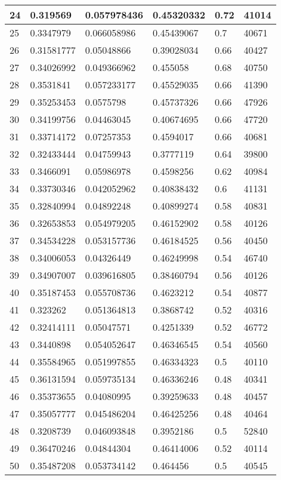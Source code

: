 \begin{longtable}{|l|l|l|l|l|l|}
24 & 0.319569 & 0.057978436 & 0.45320332 & 0.72 & 41014 \\ \hline 
25 & 0.3347979 & 0.066058986 & 0.45439067 & 0.7 & 40671 \\ \hline 
26 & 0.31581777 & 0.05048866 & 0.39028034 & 0.66 & 40427 \\ \hline 
27 & 0.34026992 & 0.049366962 & 0.455058 & 0.68 & 40750 \\ \hline 
28 & 0.3531841 & 0.057233177 & 0.45529035 & 0.66 & 41390 \\ \hline 
29 & 0.35253453 & 0.0575798 & 0.45737326 & 0.66 & 47926 \\ \hline 
30 & 0.34199756 & 0.04463045 & 0.40674695 & 0.66 & 47720 \\ \hline 
31 & 0.33714172 & 0.07257353 & 0.4594017 & 0.66 & 40681 \\ \hline 
32 & 0.32433444 & 0.04759943 & 0.3777119 & 0.64 & 39800 \\ \hline 
33 & 0.3466091 & 0.05986978 & 0.4598256 & 0.62 & 40984 \\ \hline 
34 & 0.33730346 & 0.042052962 & 0.40838432 & 0.6 & 41131 \\ \hline 
35 & 0.32840994 & 0.04892248 & 0.40899274 & 0.58 & 40831 \\ \hline 
36 & 0.32653853 & 0.054979205 & 0.46152902 & 0.58 & 40126 \\ \hline 
37 & 0.34534228 & 0.053157736 & 0.46184525 & 0.56 & 40450 \\ \hline 
38 & 0.34006053 & 0.04326449 & 0.46249998 & 0.54 & 46740 \\ \hline 
39 & 0.34907007 & 0.039616805 & 0.38460794 & 0.56 & 40126 \\ \hline 
40 & 0.35187453 & 0.055708736 & 0.4623212 & 0.54 & 40877 \\ \hline 
41 & 0.323262 & 0.051364813 & 0.3868742 & 0.52 & 40316 \\ \hline 
42 & 0.32414111 & 0.05047571 & 0.4251339 & 0.52 & 46772 \\ \hline 
43 & 0.3440898 & 0.054052647 & 0.46346545 & 0.54 & 40560 \\ \hline 
44 & 0.35584965 & 0.051997855 & 0.46334323 & 0.5 & 40110 \\ \hline 
45 & 0.36131594 & 0.059735134 & 0.46336246 & 0.48 & 40341 \\ \hline 
46 & 0.35373655 & 0.04080995 & 0.39259633 & 0.48 & 40457 \\ \hline 
47 & 0.35057777 & 0.045486204 & 0.46425256 & 0.48 & 40464 \\ \hline 
48 & 0.3208739 & 0.046093848 & 0.3952186 & 0.5 & 52840 \\ \hline 
49 & 0.36470246 & 0.04844304 & 0.46414006 & 0.52 & 40114 \\ \hline 
50 & 0.35487208 & 0.053734142 & 0.464456 & 0.5 & 40545 \\ \hline 
\end{longtable}
